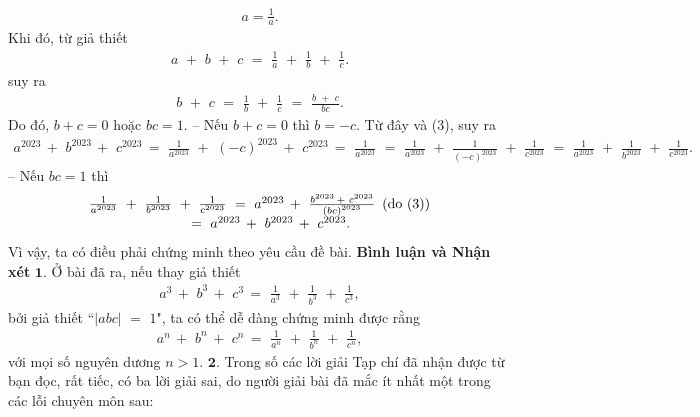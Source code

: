 \begin{multicols}{2}
{\begin{align*}
		a = \frac{1}{a}. \tag{$3$}
	\end{align*}
	Khi đó, từ giả thiết
	\begin{align*}
		a\,\, + \,\,b\,\, + \,\,c\,\, = \,\,\frac{1}{a}\,\, + \,\,\frac{1}{b}\,\, + \,\,\frac{1}{c}.
	\end{align*}
	suy ra
	\begin{align*}
		b\,\, + \,\,c\,\, = \,\,\frac{1}{b}\,\, + \,\,\frac{1}{c}\,\, = \,\,\frac{{b\,\, + \,\,c}}{{bc}}.
	\end{align*}
	Do đó, $b + c = 0$ hoặc $bc = 1$.
	\vskip 0.05cm
	-- Nếu $b + c = 0$ thì $b = - c$. Từ đây và ($3$), suy ra
	\begin{align*}
		{a^{2023}}\, + \,\,{b^{2023}}\, + \,\,{c^{2023}}\, = \,\,\frac{1}{{{a^{2023}}}}\,\, + \,\,{\left( { - c} \right)^{2023}}\, + \,\,{c^{2023}}\, = \,\,\frac{1}{{{a^{2023}}}}\,\, = \,\,\frac{1}{{{a^{2023}}}}\,\, + \,\,\frac{1}{{{{\left( { - c} \right)}^{2023}}}}\,\, + \,\,\frac{1}{{{c^{2023}}}}\,\, = \,\,\frac{1}{{{a^{2023}}}}\,\, + \,\,\frac{1}{{{b^{2023}}}}\,\, + \,\,\frac{1}{{{c^{2023}}}}.
	\end{align*}
	-- Nếu $bc = 1$ thì
	\begin{align*}
		\begin{array}{l}
			\frac{1}{{{a^{2023}}}}\,\, + \,\,\frac{1}{{{b^{2023}}}}\,\, + \,\,\frac{1}{{{c^{2023}}}}\,\, = \,\,{a^{2023}}\, + \,\,\frac{{{b^{2023}}\, + \,\,{c^{2023}}}}{{{{\left( {bc} \right)}^{2023}}}}\,\,\,({\rm{do}}\,\,(3))\\
			\,\,\,\,\,\,\,\,\,\,\,\,\,\,\,\,\,\,\,\,\,\,\,\,\,\,\,\,\,\,\,\,\,\,\,\,\,\,\,\,\,\,\,\, = \,\,{a^{2023}}\, + \,\,{b^{2023}}\, + \,\,{c^{2023}}.
		\end{array}
	\end{align*}
	Vì vậy, ta có điều phải chứng minh theo yêu cầu đề bài.
	\vskip 0.05cm
	\textbf{Bình luận và Nhận xét}
	\vskip 0.05cm
	$\pmb{1.}$ Ở bài đã ra, nếu thay giả thiết
	\begin{align*}
		{a^3}\, + \,\,{b^3}\, + \,\,{c^3}\, = \,\,\frac{1}{{{a^3}}}\,\, + \,\,\frac{1}{{{b^3}}}\,\, + \,\,\frac{1}{{{c^3}}},
	\end{align*}
	bởi giả thiết ``$|abc|\,\, = \,\,1$", ta có thể dễ dàng chứng minh được rằng
	\begin{align*}
		{a^n}\, + \,\,{b^n}\, + \,\,{c^n}\, = \,\,\frac{1}{{{a^n}}}\,\, + \,\,\frac{1}{{{b^n}}}\,\, + \,\,\frac{1}{{{c^n}}},
	\end{align*}
	với mọi số nguyên dương $n > 1$.
	\vskip 0.05cm
	$\pmb{2.}$ Trong số các lời giải Tạp chí đã nhận được từ bạn đọc, rất tiếc, có ba lời giải sai, do người giải bài đã mắc ít nhất một trong các lỗi chuyên môn sau:
}
\end{multicols}
